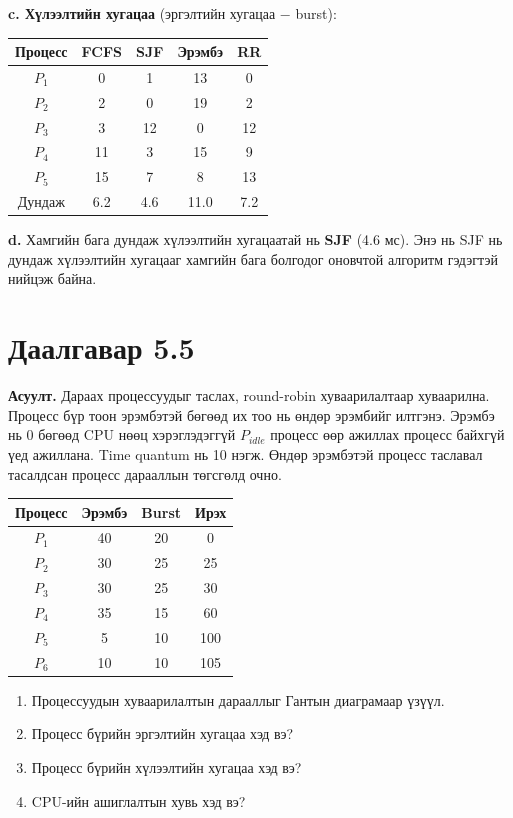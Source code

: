 \documentclass[12pt,a4paper]{article}
\newcommand{\q}[1]{\par\noindent\textbf{Асуулт.} #1\par}
\begin{document}
\textbf{c. Хүлээлтийн хугацаа} (эргэлтийн хугацаа $-$ burst):
\begin{center}
\begin{tabular}{ccccc}
\toprule
Процесс & FCFS & SJF & Эрэмбэ & RR \\
\midrule
$P_1$ & 0 & 1 & 13 & 0 \\
$P_2$ & 2 & 0 & 19 & 2 \\
$P_3$ & 3 & 12 & 0 & 12 \\
$P_4$ & 11 & 3 & 15 & 9 \\
$P_5$ & 15 & 7 & 8 & 13 \\
\midrule
Дундаж & 6.2 & 4.6 & 11.0 & 7.2 \\
\bottomrule
\end{tabular}
\end{center}

\textbf{d.} Хамгийн бага дундаж хүлээлтийн хугацаатай нь \textbf{SJF} (4.6 мс). Энэ нь SJF нь дундаж хүлээлтийн хугацааг хамгийн бага болгодог оновчтой алгоритм гэдэгтэй нийцэж байна.

\section{Даалгавар 5.5}
\q{Дараах процессуудыг таслах, round-robin хуваарилалтаар хуваарилна. Процесс бүр тоон эрэмбэтэй бөгөөд их тоо нь өндөр эрэмбийг илтгэнэ. Эрэмбэ нь 0 бөгөөд CPU нөөц хэрэглэдэггүй $P_{idle}$ процесс өөр ажиллах процесс байхгүй үед ажиллана. Time quantum нь 10 нэгж. Өндөр эрэмбэтэй процесс таславал тасалдсан процесс дарааллын төгсгөлд очно.}
\begin{center}
\begin{tabular}{cccc}
\toprule
Процесс & Эрэмбэ & Burst & Ирэх \\
\midrule
$P_1$ & 40 & 20 & 0 \\
$P_2$ & 30 & 25 & 25 \\
$P_3$ & 30 & 25 & 30 \\
$P_4$ & 35 & 15 & 60 \\
$P_5$ & 5 & 10 & 100 \\
$P_6$ & 10 & 10 & 105 \\
\bottomrule
\end{tabular}
\end{center}
\begin{enumerate}[label=\alph*.,nosep]
\item Процессуудын хуваарилалтын дарааллыг Гантын диаграмаар үзүүл.
\item Процесс бүрийн эргэлтийн хугацаа хэд вэ?
\item Процесс бүрийн хүлээлтийн хугацаа хэд вэ?
\item CPU-ийн ашиглалтын хувь хэд вэ?
\end{enumerate}
\end{document}
